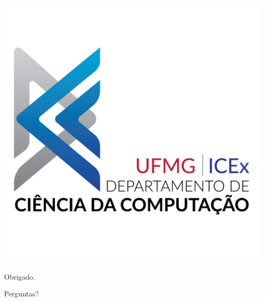 \documentclass[
	11pt, %
]{beamer}
\begin{document}

\begin{frame}[plain] %
	\begin{center}
		
		\includegraphics[width=0.3\linewidth]{logo.png}
		
		\bigskip
		
		{\Huge Obrigado.}
		
		\bigskip\bigskip %
		
		{\LARGE Perguntas?}
	\end{center}
\end{frame}

\end{document}

